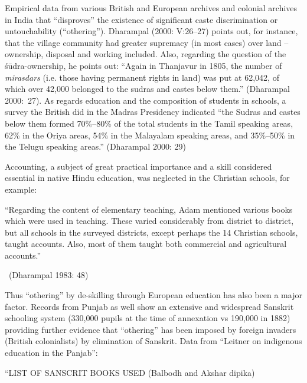 Empirical data from various British and European archives and colonial archives in India that “disproves” the existence of significant caste discrimination or untouchability (“othering”). Dharampal (2000: V:26–27) points out, for instance, that the village community had greater supremacy (in most cases) over land – ownership, disposal and working included. Also, regarding the question of the śūdra-ownership, he points out: “Again in Thanjavur in 1805, the number of \textit{mirasdars} (i.e. those having permanent rights in land) was put at 62,042, of which over 42,000 belonged to the sudras and castes below them.” (Dharampal 2000:~27). As regards education and the composition of students in schools, a survey the British did in the Madras Presidency indicated “the Sudras and castes below them formed 70\%–80\% of the total students in the Tamil speaking areas, 62\% in the Oriya areas, 54\% in the Malayalam speaking areas, and 35\%–50\% in the Telugu speaking areas.” (Dharampal 2000: 29)

Accounting, a subject of great practical importance and a skill considered essential in native Hindu education, was neglected in the Christian schools, for example:

\begin{myquote}
“Regarding the content of elementary teaching, Adam mentioned various books which were used in teaching. These varied considerably from district to district, but all schools in the surveyed districts, except perhaps the 14 Christian schools, taught accounts. Also, most of them taught both commercial and agricultural accounts.” 

~\hfill (Dharampal 1983: 48)
\end{myquote}

Thus “othering” by de-skilling through European education has also been a major factor. Records from Punjab as well show an extensive and widespread Sanskrit schooling system (330,000 pupils at the time of annexation vs 190,000 in 1882) providing further evidence that “othering” has been imposed by foreign invaders (British colonialists) by elimination of Sanskrit. Data from “Leitner on indigenous education in the Panjab”:

“LIST OF SANSCRIT BOOKS USED (Balbodh and Akshar dipika)

